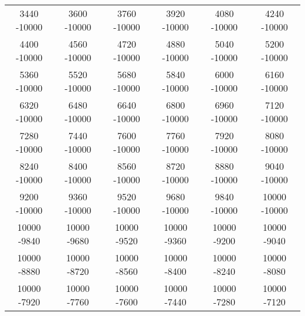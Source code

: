 \begin{landscape}
\begin{table}[]
\begin{tabular}{|cccccc|}
		3440 -10000 & 3600 -10000 & 3760 -10000 & 3920 -10000 & 4080 -10000 & 4240 -10000\\
		4400 -10000 & 4560 -10000 & 4720 -10000 & 4880 -10000 & 5040 -10000 & 5200 -10000\\
		5360 -10000 & 5520 -10000 & 5680 -10000 & 5840 -10000 & 6000 -10000 & 6160 -10000\\
		6320 -10000 & 6480 -10000 & 6640 -10000 & 6800 -10000 & 6960 -10000 & 7120 -10000\\
		7280 -10000 & 7440 -10000 & 7600 -10000 & 7760 -10000 & 7920 -10000 & 8080 -10000\\
		8240 -10000 & 8400 -10000 & 8560 -10000 & 8720 -10000 & 8880 -10000 & 9040 -10000\\
		9200 -10000 & 9360 -10000 & 9520 -10000 & 9680 -10000 & 9840 -10000 & 10000 -10000\\
		10000 -9840 & 10000 -9680 & 10000 -9520 & 10000 -9360 & 10000 -9200 & 10000 -9040\\
		10000 -8880 & 10000 -8720 & 10000 -8560 & 10000 -8400 & 10000 -8240 & 10000 -8080\\
		10000 -7920 & 10000 -7760 & 10000 -7600 & 10000 -7440 & 10000 -7280 & 10000 -7120\\ \hline
        \end{tabular}
    \end{table}
\end{landscape}
